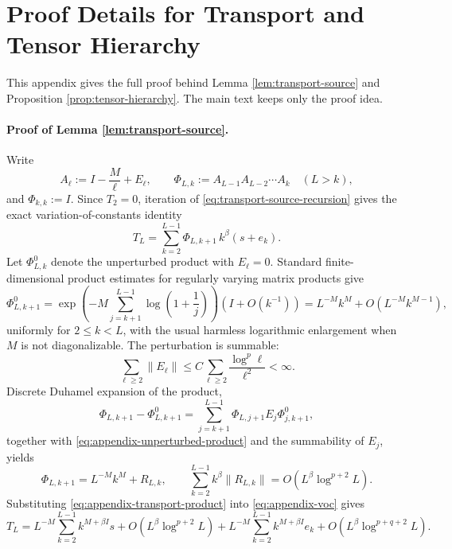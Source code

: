 \documentclass{article}
\begin{document}
\appendix
\renewcommand{\theHfigure}{appendix.\arabic{figure}}
\renewcommand{\theHtable}{appendix.\arabic{table}}

\section{Proof Details for Transport and Tensor Hierarchy}
\label{app:transport-hierarchy-proof}
This appendix gives the full proof behind Lemma \ref{lem:transport-source} and Proposition \ref{prop:tensor-hierarchy}. The main text keeps only the proof idea.

\paragraph{Proof of Lemma \ref{lem:transport-source}.}
Write
\[
A_\ell:=I-\frac{M}{\ell}+E_\ell,
\qquad
\Phi_{L,k}:=A_{L-1}A_{L-2}\cdots A_k
\quad (L>k),
\]
and \(\Phi_{k,k}:=I\). Since \(T_2=0\), iteration of \eqref{eq:transport-source-recursion} gives the exact variation-of-constants identity
\begin{equation}
T_L
=
\sum_{k=2}^{L-1}\Phi_{L,k+1}\,k^\beta(s+e_k).
\label{eq:appendix-voc}
\end{equation}
Let \(\Phi^0_{L,k}\) denote the unperturbed product with \(E_\ell=0\). Standard finite-dimensional product estimates for regularly varying matrix products give
\begin{equation}
\Phi^0_{L,k+1}
=
\exp\!\left(-M\sum_{j=k+1}^{L-1}\log\left(1+\frac1j\right)\right)
\left(I+O(k^{-1})\right)
=
L^{-M}k^{M}+O\!\left(L^{-M}k^{M-1}\right),
\label{eq:appendix-unperturbed-product}
\end{equation}
uniformly for \(2\le k<L\), with the usual harmless logarithmic enlargement when \(M\) is not diagonalizable. The perturbation is summable:
\[
\sum_{\ell\ge2}\|E_\ell\|
\le
C\sum_{\ell\ge2}\frac{\log^p\ell}{\ell^2}
<\infty.
\]
Discrete Duhamel expansion of the product,
\[
\Phi_{L,k+1}-\Phi^0_{L,k+1}
=
\sum_{j=k+1}^{L-1}
\Phi_{L,j+1}E_j\Phi^0_{j,k+1},
\]
together with \eqref{eq:appendix-unperturbed-product} and the summability of \(E_j\), yields
\begin{equation}
\Phi_{L,k+1}
=
L^{-M}k^M+R_{L,k},
\qquad
\sum_{k=2}^{L-1} k^\beta\|R_{L,k}\|
=
O\!\left(L^\beta\log^{p+2}L\right).
\label{eq:appendix-transport-product}
\end{equation}
Substituting \eqref{eq:appendix-transport-product} into \eqref{eq:appendix-voc} gives
\begin{equation}
T_L
=
L^{-M}\sum_{k=2}^{L-1}k^{M+\beta I}s
+O\!\left(L^\beta\log^{p+2}L\right)
+L^{-M}\sum_{k=2}^{L-1}k^{M+\beta I}e_k
+O\!\left(L^\beta\log^{p+q+2}L\right).
\label{eq:appendix-transport-sum}
\end{equation}
\end{document}
